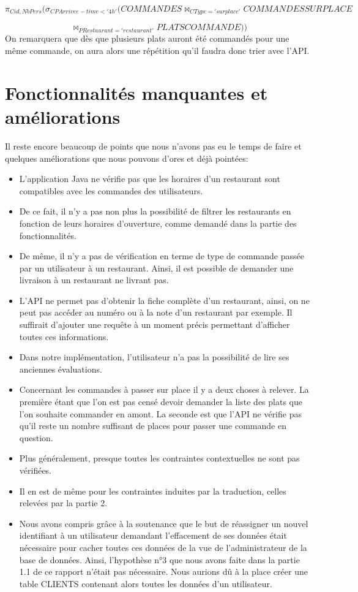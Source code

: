 \documentclass[10pt, a4paper]{article}
\begin{document}
$$
    \pi_{Cid, NbPers}(\sigma_{CPArrivee - time < '4h'}(COMMANDES \Join_{CType = 'sur place'} COMMANDESSURPLACE
    $$

    $$
    \Join_{PRestaurant = 'restaurant'} PLATSCOMMANDE))
$$
On remarquera que dès que plusieurs plats auront été commandés pour une même commande, on aura alors
une répétition qu'il faudra donc trier avec l'API.

\section{Fonctionnalités manquantes et améliorations}

Il reste encore beaucoup de points que nous n'avons pas eu le temps de faire et quelques améliorations que nous pouvons d'ores et déjà pointées:

\begin{itemize}
    \item L'application Java ne vérifie pas que les horaires d'un restaurant sont compatibles avec les commandes des utilisateurs.
    \item De ce fait, il n'y a pas non plus la possibilité de filtrer les restaurants en fonction de leurs horaires d'ouverture, comme demandé dans la partie des fonctionnalités.
    \item De même, il n'y a pas de vérification en terme de type de commande passée par un utilisateur à un restaurant. Ainsi, il est possible de demander une livraison à un restaurant ne livrant pas.
    \item L'API ne permet pas d'obtenir la fiche complète d'un restaurant, ainsi, on ne peut pas accéder au numéro ou à la note d'un restaurant par exemple. Il suffirait d'ajouter une requête à un moment précis permettant d'afficher toutes ces informations.
    \item Dans notre implémentation, l'utilisateur n'a pas la possibilité de lire ses anciennes évaluations.
    \item Concernant les commandes à passer sur place il y a deux choses à relever. La première étant que l'on est pas censé devoir demander la liste des plats que l'on souhaite commander en amont. La seconde est que l'API ne vérifie pas qu'il reste un nombre suffisant de places pour passer une commande en question.
    \item Plus généralement, presque toutes les contraintes contextuelles ne sont pas vérifiées.
    \item Il en est de même pour les contraintes induites par la traduction, celles relevées par la partie 2.
    \item Nous avons compris grâce à la soutenance que le but de réassigner un nouvel identifiant à un utilisateur demandant l'effacement de ses données était nécessaire pour cacher toutes ces données de la vue de l'administrateur de la base de données. Ainsi, l'hypothèse n°3 que nous avons faite dans la partie 1.1 de ce rapport n'était pas nécessaire. Nous aurions dû à la place créer une table CLIENTS contenant alors toutes les données d'un utilisateur.
\end{itemize}
\end{document}
